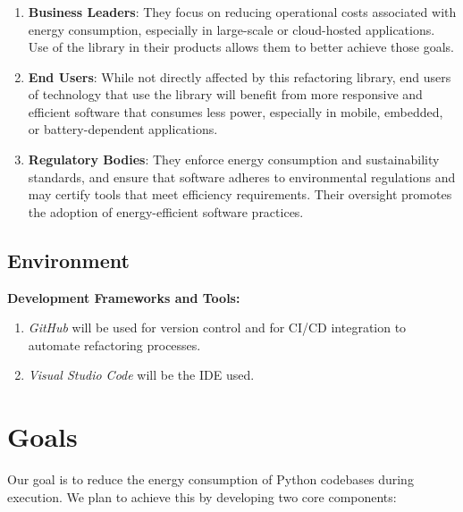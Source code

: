 \documentclass{article}
\begin{document}
\subsubsection*{\color{blue}{Indirect Stakeholders}}
\begin{enumerate}

  \item \textbf{Business Leaders}: They focus on reducing operational
    costs associated with energy consumption, especially in
    large-scale or cloud-hosted applications. Use of the
    library in their products allows them to better achieve those goals.
  \item \textbf{End Users}: While not directly affected by this
    refactoring library, end users of technology that use the library
    will benefit from more responsive and efficient
    software that consumes less power, especially in mobile,
    embedded, or battery-dependent applications.
  \item \textbf{Regulatory Bodies}: They enforce energy consumption
    and sustainability standards, and ensure that software adheres to
    environmental regulations and may certify tools
    that meet efficiency requirements. Their oversight promotes the
    adoption of energy-efficient software practices.

\end{enumerate}

\subsection{Environment}
\textbf{Development Frameworks and Tools:}
\begin{enumerate}

  \item \textit{GitHub} will be used for version control and for
    CI/CD integration to automate refactoring processes.
  \item \textit{Visual Studio Code} will be the IDE used.

\end{enumerate}

\section{Goals}

Our goal is to reduce the energy consumption of Python codebases
during execution. We plan to achieve this by developing two core components:
\end{document}
